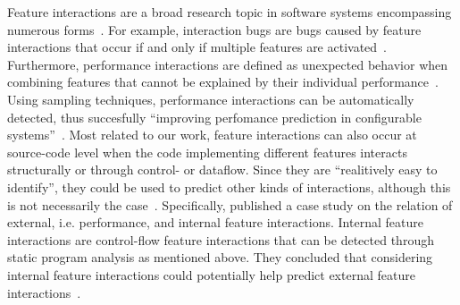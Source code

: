 Feature interactions are a broad research topic in software systems encompassing numerous forms~\cite{apel2014feature}.
For example, interaction bugs are bugs caused by feature interactions that occur if and only if multiple features are activated~\cite{nie2011survey}.
Furthermore, performance interactions are defined as unexpected behavior when combining features that cannot be explained by their individual performance~\cite{siegmund2012predicting}.
Using sampling techniques, performance interactions can be automatically detected, thus succesfully ``improving perfomance prediction in configurable systems''~\cite{apel2014feature}.
Most related to our work, feature interactions can also occur at source-code level when the code implementing different features interacts structurally or through control- or dataflow.
Since they are ``realitively easy to identify''\cite{apel2014feature}, they could be used to predict other kinds of interactions, although this is not necessarily the case~\cite{apel2014feature}.
Specifically, \citet{kolesnikov2017relation} published a case study on the relation of external, i.e. performance, and internal feature interactions.  
Internal feature interactions are control-flow feature interactions that can be detected through static program analysis as mentioned above. 
They concluded that considering internal feature interactions could potentially help predict external feature interactions~\cite{kolesnikov2017relation}.


